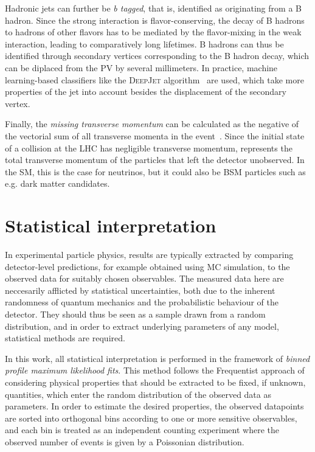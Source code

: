 Hadronic jets can further be \textit{b tagged}, that is, identified as originating from a B hadron. Since the strong interaction is flavor-conserving, the decay of B hadrons to hadrons of other flavors has to be mediated by the flavor-mixing in the weak interaction, leading to comparatively long lifetimes. B hadrons can thus be identified through secondary vertices corresponding to the B hadron decay, which can be diplaced from the PV by several millimeters. In practice, machine learning-based classifiers like the \textsc{DeepJet} algorithm~\cite{DeepJet:2020} are used, which take more properties of the jet into account besides the displacement of the secondary vertex.

Finally, the \textit{missing transverse momentum} \ptmissvec can be calculated as the negative of the vectorial sum of all transverse momenta in the event~\cite{CMS:JME-17-001}. Since the initial state of a collision at the LHC has negligible transverse momentum, \ptmissvec represents the total transverse momentum of the particles that left the detector unobserved. In the SM, this is the case for neutrinos, but it could also be BSM particles such as e.g. dark matter candidates.

\section{Statistical interpretation}
\label{sec:methods:stat}

In experimental particle physics, results are typically extracted by comparing detector-level predictions, for example obtained using MC simulation, to the observed data for suitably chosen observables. The measured data here are neccesarily afflicted by statistical uncertainties, both due to the inherent randomness of quantum mechanics and the probabilistic behaviour of the detector. They should thus be seen as a sample drawn from a random distribution, and in order to extract underlying parameters of any model, statistical methods are required.

In this work, all statistical interpretation is performed in the framework of \textit{binned profile maximum likelihood fits}. This method follows the Frequentist approach of considering physical properties that should be extracted to be fixed, if unknown, quantities, which enter the random distribution of the observed data as parameters. In order to estimate the desired properties, the observed datapoints are sorted into orthogonal bins according to one or more sensitive observables, and each bin is treated as an independent counting experiment where the observed number of events is given by a Poissonian distribution. 

